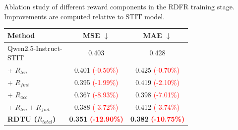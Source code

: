 \documentclass[10pt]{article}
\begin{document}
\begin{minipage}{3.4in}

\setlength{\textwidth}{\linewidth}

\captionsetup{type=table}

\centering
    \caption{Ablation study of different reward components in the RDFR training stage. Improvements are computed relative to STIT model.}
    \label{tab:ablation_02}

    \vspace{-5pt}

    \newcommand{\imp}[1]{{\textcolor{red}{(#1)}}}
    \newcommand{\bimp}[1]{{\textbf{\textcolor{red}{(#1)}}}}

    \begin{tabular}{lcc}
        \toprule
        \textbf{Method}
        & \textbf{MSE} $\downarrow$
        & \textbf{MAE} $\downarrow$ \\
        \midrule
        \shortstack[l]{Qwen2.5-Instruct-\\STIT}
        & 0.403 & 0.428 \\
        \midrule
        + $R_{len}$
        & 0.401 \imp{-0.50\%}
        & 0.425 \imp{-0.70\%} \\
        + $R_{fmt}$
        & 0.395 \imp{-1.99\%}
        & 0.419 \imp{-2.10\%} \\
        + $R_{acc}$
        & 0.367 \imp{-8.93\%}
        & 0.398 \imp{-7.01\%} \\
        + $R_{len} + R_{fmt}$
        & 0.388 \imp{-3.72\%}
        & 0.412 \imp{-3.74\%} \\
        \midrule
        \textbf{RDTU ($R_{total}$)}
        & \textbf{0.351} \bimp{-12.90\%}
        & \textbf{0.382} \bimp{-10.75\%} \\
        \bottomrule
    \end{tabular}
    \vspace{-12pt}

\end{minipage}\par\endgroup

\clearpage
\end{document}
